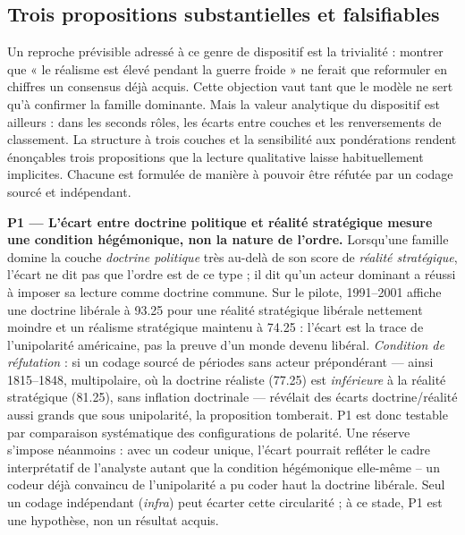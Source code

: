 \documentclass[11pt,a4paper]{article}
\begin{document}
\subsection{Trois propositions substantielles et falsifiables}

Un reproche prévisible adressé à ce genre de dispositif est la trivialité : montrer que « le réalisme est élevé pendant la guerre froide » ne ferait que reformuler en chiffres un consensus déjà acquis. Cette objection vaut tant que le modèle ne sert qu'à confirmer la famille dominante. Mais la valeur analytique du dispositif est ailleurs : dans les seconds rôles, les écarts entre couches et les renversements de classement. La structure à trois couches et la sensibilité aux pondérations rendent énonçables trois propositions que la lecture qualitative laisse habituellement implicites. Chacune est formulée de manière à pouvoir être réfutée par un codage sourcé et indépendant.

\textbf{P1 --- L'écart entre doctrine politique et réalité stratégique mesure une condition hégémonique, non la nature de l'ordre.} Lorsqu'une famille domine la couche \emph{doctrine politique} très au-delà de son score de \emph{réalité stratégique}, l'écart ne dit pas que l'ordre est de ce type ; il dit qu'un acteur dominant a réussi à imposer sa lecture comme doctrine commune. Sur le pilote, 1991--2001 affiche une doctrine libérale à 93.25 pour une réalité stratégique libérale nettement moindre et un réalisme stratégique maintenu à 74.25 : l'écart est la trace de l'unipolarité américaine, pas la preuve d'un monde devenu libéral. \emph{Condition de réfutation} : si un codage sourcé de périodes sans acteur prépondérant --- ainsi 1815--1848, multipolaire, où la doctrine réaliste (77.25) est \emph{inférieure} à la réalité stratégique (81.25), sans inflation doctrinale --- révélait des écarts doctrine/réalité aussi grands que sous unipolarité, la proposition tomberait. P1 est donc testable par comparaison systématique des configurations de polarité. Une réserve s'impose néanmoins : avec un codeur unique, l'écart pourrait refléter le cadre interprétatif de l'analyste autant que la condition hégémonique elle-même -- un codeur déjà convaincu de l'unipolarité a pu coder haut la doctrine libérale. Seul un codage indépendant (\emph{infra}) peut écarter cette circularité ; à ce stade, P1 est une hypothèse, non un résultat acquis.
\end{document}
